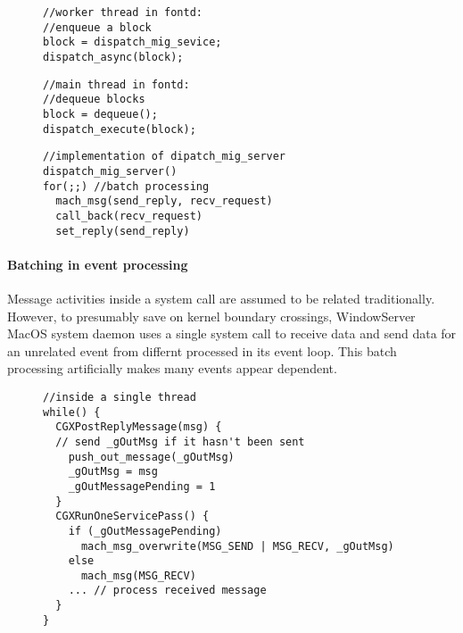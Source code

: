 \begin{figure}[ht!]
\begin{minipage}[t]{.25\textwidth}
\begin{lstlisting}
//worker thread in fontd:
//enqueue a block
block = dispatch_mig_sevice;
dispatch_async(block);
\end{lstlisting}
\end{minipage}\hfill
\begin{minipage}[t]{.21\textwidth}
\begin{lstlisting}
//main thread in fontd:
//dequeue blocks
block = dequeue();
dispatch_execute(block);
\end{lstlisting}
\end{minipage}

\begin{minipage}[t]{0.48\textwidth}
\begin{lstlisting}
//implementation of dipatch_mig_server
dispatch_mig_server()
for(;;) //batch processing
  mach_msg(send_reply, recv_request)
  call_back(recv_request)
  set_reply(send_reply)
\end{lstlisting}
\end{minipage}
    \label{fig:dispatchmessagebatching}
\end{figure}

\paragraph{Batching in event processing}

Message activities inside a system call are assumed to be related traditionally.
However, to presumably save on kernel boundary crossings, WindowServer MacOS
system daemon uses a single system call to receive data and send data for an
unrelated event from differnt processed in its event loop. This batch processing
artificially makes many events appear dependent.

\begin{figure}[ht!]
\begin{lstlisting}
//inside a single thread
while() {
  CGXPostReplyMessage(msg) {
  // send _gOutMsg if it hasn't been sent
    push_out_message(_gOutMsg)
    _gOutMsg = msg
    _gOutMessagePending = 1
  }
  CGXRunOneServicePass() {
    if (_gOutMessagePending)
      mach_msg_overwrite(MSG_SEND | MSG_RECV, _gOutMsg)
    else
      mach_msg(MSG_RECV)
    ... // process received message
  }
}
\end{lstlisting}
    \label{fig:batchingineventprocessing}
\end{figure}

